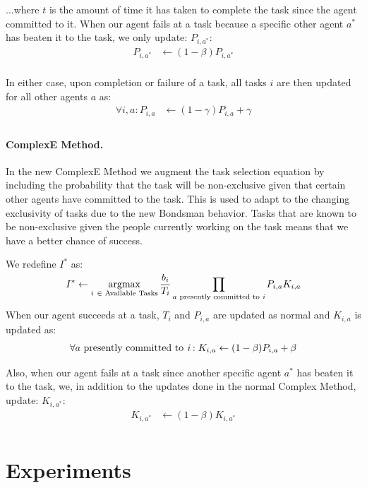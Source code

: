 \documentclass[letterpaper]{aamas2015}
\newcommand\paragrapha[1]{\paragraph*{{#1}.}}
\DeclareMathOperator*{\argmax}{argmax}
\begin{document}
\noindent ...where \(t\) is the amount of time it has taken to complete the task since the agent committed to it.  When our agent fails at a task because a specific other agent \(a^*\) has beaten it to the task, we only update: \(P_{i,a^*}\):
\[
\begin{split}
P_{i,a^*} & \leftarrow (1-\beta)P_{i,a^*}\\
\end{split}
\]

In either case, upon completion or failure of a task, all tasks \(i\) are then updated for all other agents \(a\) as:
\[
\begin{split}
\forall i,a: P_{i,a} & \leftarrow (1-\gamma)P_{i,a} + \gamma\\
\end{split}
\]

\paragrapha{ComplexE Method}

In the new ComplexE Method we augment the task selection equation by including the probability that the task will be non-exclusive given that certain other agents have committed to the task.  This is used to adapt to the changing exclusivity of tasks due to the new Bondsman behavior.  Tasks that are known to be non-exclusive given the people currently working on the task means that we have a better chance of success.

We redefine \(I^*\) as:
\[
I^* \leftarrow \argmax_{i\ \in \text{\ Available Tasks}} \smash{\frac{b_i}{T_i}}  \prod_{a \text{\ presently committed to {\it i}}} P_{i,a} K_{i,a}
\]
When our agent succeeds at a task, \(T_i\) and \(P_{i,a}\) are updated as normal and \(K_{i,a}\) is updated as:
\[
\begin{split}
\forall a\ {\text{presently committed to {\it i}}}: K_{i,a} &\leftarrow (1-\beta)P_{i,a} + \beta\\
\end{split}
\]

Also, when our agent fails at a task since another specific agent \(a^*\) has beaten it to the task, we, in addition to the updates done in the normal Complex Method, update: \(K_{i,a^*}\):
\[
\begin{split}
K_{i,a^*} & \leftarrow (1-\beta)K_{i,a^*}\\
\end{split}
\]


\section{Experiments}
\end{document}
